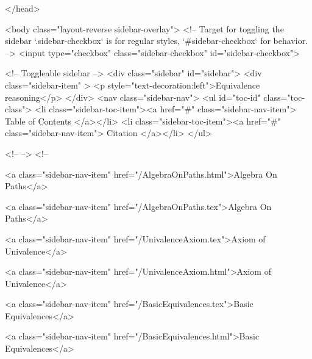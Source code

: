   
</head>




  <body class="layout-reverse sidebar-overlay">
    <!-- Target for toggling the sidebar `.sidebar-checkbox` is for regular
     styles, `#sidebar-checkbox` for behavior. -->
<input type="checkbox" class="sidebar-checkbox" id="sidebar-checkbox">

<!-- Toggleable sidebar -->
<div class="sidebar" id="sidebar">
  <div class="sidebar-item" >
    <p style="text-decoration:left">Equivalence reasoning</p>
  </div>
  <nav class="sidebar-nav">
    <ul id="toc-id" class="toc-class">
  <li class="sidebar-toc-item"><a href="#" class="sidebar-nav-item"> Table of Contents </a></li>
  <li class="sidebar-toc-item"><a href="#" class="sidebar-nav-item"> Citation </a></li>
</ul>


    <!--  -->
    <!-- 
      
    
      
    
      
    
      
    
      
        
      
    
      
        
          <a class="sidebar-nav-item" href="/AlgebraOnPaths.html">Algebra On Paths</a>
        
      
    
      
        
          <a class="sidebar-nav-item" href="/AlgebraOnPaths.tex">Algebra On Paths</a>
        
      
    
      
        
          <a class="sidebar-nav-item" href="/UnivalenceAxiom.tex">Axiom of Univalence</a>
        
      
    
      
        
          <a class="sidebar-nav-item" href="/UnivalenceAxiom.html">Axiom of Univalence</a>
        
      
    
      
        
          <a class="sidebar-nav-item" href="/BasicEquivalences.tex">Basic Equivalences</a>
        
      
    
      
        
          <a class="sidebar-nav-item" href="/BasicEquivalences.html">Basic Equivalences</a>
        
